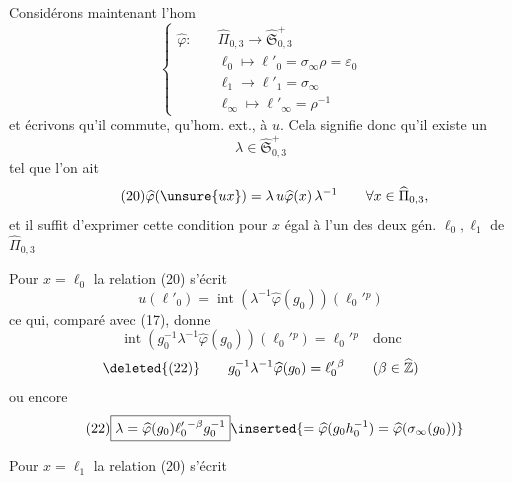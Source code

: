 
Considérons maintenant l'hom 
\[
\tag{18}
\left\{
\begin{aligned}
\widehat\varphi:\quad &\widehat\Pi_{0,3}\longrightarrow
  \widehat{\mathfrak S}_{0,3}^{+}\\
&\ell_0\longmapsto\ell'_0=\sigma_\infty\rho=\varepsilon_0\\
&\ell_1\longrightarrow\ell'_1=\sigma_\infty\\
&\ell_\infty\longmapsto\ell'_\infty=\rho^{-1}
\end{aligned}
\right.
\]
et écrivons qu'il commute,  qu'hom. ext., à $u$.
Cela signifie donc qu'il existe un
\[
\tag{19}
\lambda\in\widehat{\mathfrak S}_{0,3}^{+}
\]
tel que l'on ait
\[
\tag{20}
\widehat\varphi(\unsure{ux})=\lambda\,u\widehat\varphi(x)\,\lambda^{-1}
\qquad \forall x\in\widehat\Pi_{0,3},
\]
et il suffit d'exprimer cette condition pour $x$ égal à l'un des deux
gén. $\ell_0,\ell_1$ de $\widehat\Pi_{0,3}$

Pour $x=\ell_0$ la relation (20) s'écrit
\[
\tag{21}
u(\ell'_0)=\operatorname{int}(\lambda^{-1}\widehat\varphi(g_0))(\ell_0'{}^{p})
\]
ce qui, comparé avec (17), donne
\[
\operatorname{int}(g_0^{-1}\lambda^{-1}\widehat\varphi(g_0))(\ell_0'{}^{p})
=\ell_0'{}^{p}\quad\text{donc}
\]
\[
\deleted{(22)}\qquad
g_0^{-1}\lambda^{-1}\widehat\varphi(g_0)=\ell_0'{}^{\beta}
\qquad(\beta\in\widehat{\mathbb Z})
\]
ou encore
\[
\tag{22}
\boxed{\lambda=\widehat\varphi(g_0)\ell_0'{}^{-\beta}g_0^{-1}}
\inserted{=\widehat\varphi(g_0h_0^{-1})=\widehat\varphi(\sigma_\infty(g_0))}
\]

Pour $x=\ell_1$ la relation (20) s'écrit


